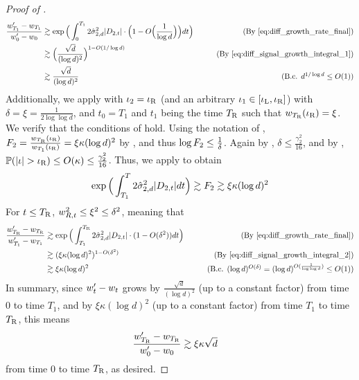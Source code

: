 \begin{proof}[Proof of ]
\begin{align}
\frac{\w_{T_1}' - \w_{T_1}}{\w_0' - \w_0}
& \gtrsim \exp\Big(\int_0^{T_1} 2 \sigmaCoeffTwo^2 |D_{2, t}| \cdot \Big(1 - O\Big(\frac{1}{\log d}\Big)\Big) dt \Big) 
& \tag{By \Cref{eq:diff_growth_rate_final}} \\
& \gtrsim \Big(\frac{\sqrt{d}}{(\log d)^2} \Big)^{1 - O(1/\log d)} 
& \tag{By \Cref{eq:diff_signal_growth_integral_1}} \\
& \gtrsim \frac{\sqrt{d}}{(\log d)^2}
& \tag{B.c. $d^{1/\log d} \leq O(1)$}
\end{align}
Additionally, we apply  with $\iota_2 = \iota_{\textup{R}}$ (and an arbitrary $\iota_1 \in [\iota_{\textup{L}}, \iota_{\textup{R}}]$) with $\delta = \xi = \frac{1}{2 \log \log d}$, and $t_0 = T_1$ and $t_1$ being the time ${T_{\textup{R}}}$ such that $w_{{T_{\textup{R}}}}(\iota_{\textup{R}}) = \xi$. We verify that the conditions of  hold. Using the notation of , $F_2 = \frac{w_{{T_{\textup{R}}}}(\iota_{\textup{R}})}{w_{T_1}(\iota_{\textup{R}})} = \xi \kappa (\log d)^2$ by , and thus $\log F_2 \leq \frac{1}{\delta}$. Again by , $\delta \leq \frac{\gamma_2^2}{16}$, and by , $\mathbb{P}(|\iota| > \iota_{\textup{R}}) \leq O(\kappa) \leq \frac{\gamma_2^2}{16}$. Thus, we apply  to obtain
\begin{align} \label{eq:diff_signal_growth_integral_2}
\exp\Big(\int_{T_1}^{T} 2 \hat{\sigma}_{2, d}^2 |D_{2, t}| dt \Big)
\gtrsim F_2
\gtrsim \xi \kappa (\log d)^2
\end{align}
For $t \leq {T_{\textup{R}}}$, $w_{R, t}^2 \leq \xi^2 \leq \delta^2$, meaning that
\begin{align}
\frac{\w_{\TR}' - \w_{\TR}}{\w_{T_1}' - \w_{T_1}}
& \gtrsim \exp\Big(\int_{T_1}^{\TR} 2 \sigmaCoeffTwo^2 |D_{2, t}| \cdot (1 - O(\delta^2)) dt \Big) 
& \tag{By \Cref{eq:diff_growth_rate_final}} \\
& \gtrsim (\xi \kappa (\log d)^2)^{1 - O(\delta^2)}
& \tag{By \Cref{eq:diff_signal_growth_integral_2}} \\
& \gtrsim \xi \kappa (\log d)^2 
& \tag{B.c. $(\log d)^{O(\delta)} = (\log d)^{O(\frac{1}{\log \log d})} \leq O(1)$}
\end{align}
In summary, since $w_t' - w_t$ grows by $\frac{\sqrt{d}}{(\log d)^2}$ (up to a constant factor) from time $0$ to time $T_1$, and by $\xi \kappa (\log d)^2$ (up to a constant factor) from time $T_1$ to time ${T_{\textup{R}}}$, this means
\begin{align}
\frac{w_{{T_{\textup{R}}}}' - w_{{T_{\textup{R}}}}}{w_0' - w_0}
& \gtrsim \xi \kappa \sqrt{d}
\end{align}
from time $0$ to time ${T_{\textup{R}}}$, as desired.
\end{proof}

